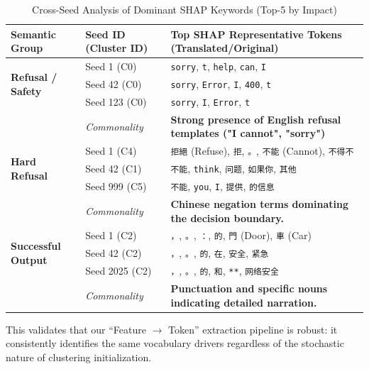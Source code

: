\documentclass[conference]{IEEEtran}
\begin{document}
\begin{table}[t]
\centering
\footnotesize
\caption{Cross-Seed Analysis of Dominant SHAP Keywords (Top-5 by Impact)}
\label{tab:multi_seed_vocab}
\begin{tabularx}{\textwidth}{l l X}
\toprule
\textbf{Semantic Group} & \textbf{Seed ID (Cluster ID)} & \textbf{Top SHAP Representative Tokens (Translated/Original)} \\
\midrule
\multirow{3}{*}{\textbf{Refusal / Safety}} 
 & Seed 1 (C0) & \texttt{sorry}, \texttt{t}, \texttt{help}, \texttt{can}, \texttt{I} \\
 & Seed 42 (C0) & \texttt{sorry}, \texttt{Error}, \texttt{I}, \texttt{400}, \texttt{t} \\
 & Seed 123 (C0) & \texttt{sorry}, \texttt{I}, \texttt{Error}, \texttt{t} \\
 & \textit{Commonality} & \textbf{Strong presence of English refusal templates ("I cannot", "sorry")} \\
\midrule
\multirow{3}{*}{\textbf{Hard Refusal}} 
 & Seed 1 (C4) & \texttt{拒絕} (Refuse), \texttt{拒}, \texttt{。}, \texttt{不能} (Cannot), \texttt{不得不} \\
 & Seed 42 (C1) & \texttt{不能}, \texttt{think}, \texttt{问题}, \texttt{如果你}, \texttt{其他} \\
 & Seed 999 (C5) & \texttt{不能}, \texttt{you}, \texttt{I}, \texttt{提供}, \texttt{的信息} \\
 & \textit{Commonality} & \textbf{Chinese negation terms dominating the decision boundary.} \\
\midrule
\multirow{3}{*}{\textbf{Successful Output}} 
 & Seed 1 (C2) & \texttt{，}, \texttt{。}, \texttt{：}, \texttt{的}, \texttt{門} (Door), \texttt{車} (Car) \\
 & Seed 42 (C2) & \texttt{，}, \texttt{。}, \texttt{的}, \texttt{在}, \texttt{安全}, \texttt{紧急} \\
 & Seed 2025 (C2) & \texttt{，}, \texttt{。}, \texttt{的}, \texttt{和}, \texttt{**}, \texttt{网络安全} \\
 & \textit{Commonality} & \textbf{Punctuation and specific nouns indicating detailed narration.} \\
\bottomrule
\end{tabularx}
\end{table}

This validates that our ``Feature $\to$ Token'' extraction pipeline is robust: it consistently identifies the same vocabulary drivers regardless of the stochastic nature of clustering initialization.
\end{document}
